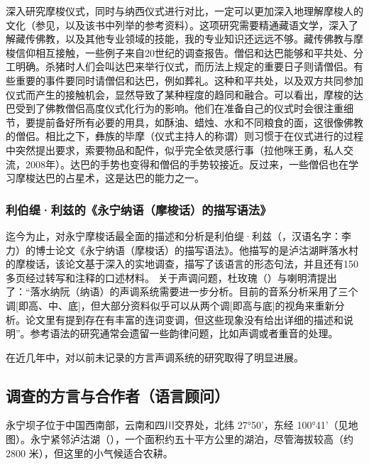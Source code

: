 深入研究摩梭仪式，同时与纳西仪式进行对比，一定可以更加深入地理解摩梭人的文化（参见\textcite{mathieu2015}，以及该书中列举的参考资料）。这项研究需要精通{藏语}文学，深入了解{藏}传佛教，以及其他专业领域的技能，我的专业知识还远远不够。{藏}传佛教与摩梭信仰相互接触，一些例子来自20世纪的调查报告。僧侣和{达巴}能够和平共处、分工明确。杀猪时人们会叫{达巴}来举行仪式，而历法上规定的重要日子则请僧侣。有些重要的事件要同时请僧侣和{达巴}，例如葬礼。这种和平共处，以及双方共同参加仪式而产生的接触机会，显然导致了某种程度的趋同和融合。可以看出，摩梭的{达巴}受到了佛教僧侣高度仪式化行为的影响。他们在准备自己的仪式时会很注重细节，要提前备好所有必要的用具，如酥油、蜡烛、水和不同粮食的面，这很像佛教的僧侣。相比之下，{彝}族的毕摩（仪式主持人的称谓）则习惯于在仪式进行的过程中突然提出要求，索要物品和配件，似乎完全依灵感行事（拉他咪王勇，私人交流，2008年）。{达巴}的手势也变得和僧侣的手势较接近。反过来，一些僧侣也在学习摩梭达巴的占星术，这是达巴的能力之一。


\subsubsection{利伯缇·利兹的《{永宁纳}语（摩梭话）的描写语法》\parencite{lidz2010}}
\label{sec:lidz2010}
迄今为止，对永宁摩梭话最全面的描述和分析是利伯缇·利兹（，汉语名字：李力）的博士论文\parencite{lidz2010}《{永宁纳}语（摩梭话）的描写语法》。他描写的是泸沽湖畔落水村的摩梭话，该论文基于深入的实地调查，描写了该语言的形态句法，并且还有150多页经过转写和注释的口述材料。
关于声调问题，杜玫瑰（）与喇明清提出了：“落水纳阮（纳语）的声调系统需要进一步分析。目前的音系分析采用了三个调[即高、中、底]，但大部分资料似乎可以从两个调[即高与底]的视角来重新分析。论文里有提到{存在}有丰富的连词变调，但这些现象没有给出详细的描述和说明”\parencite{dobbsetal2016}。参考语法的研究通常会遗留一些韵律问题，比如声调或者重音的处理\parencite[26]{zeitoun2007}。

在近几年中，对以前未记录的方言声调系统的研究取得了明显进展\parencite{a2016,dobbsetal2016,fily_documentation_2022}。

\subsection{调查的方言与合作者（语言顾问）}

永宁坝子位于中国西南部，云南和四川交界处，北纬 27°50'，东经 100°41'（见地图）。永宁紧邻泸沽湖（），一个面积约五十平方公里的湖泊，尽管海拔较高（约 2800 米），但这里的小气候适合农耕。

